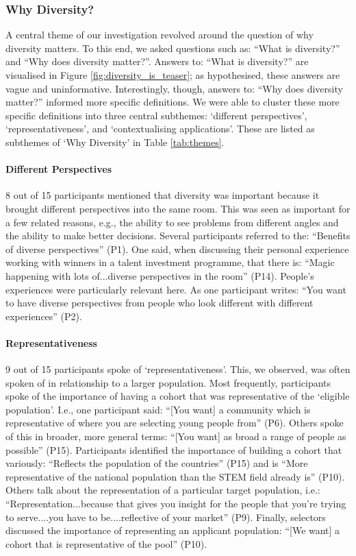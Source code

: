 \subsubsection{Why Diversity?}
A central theme of our investigation revolved around the question of why diversity matters. To this end, we asked questions such as: ``What is diversity?'' and ``Why does diversity matter?''. Answers to: ``What is diversity?'' are visualised in Figure \ref{fig:diversity_is_teaser}; as hypothesised, these answers are vague and uninformative. Interestingly, though, answers to: ``Why does diversity matter?'' informed more specific definitions. We were able to cluster these more specific definitions into three central subthemes: `different perspectives', `representativeness', and `contextualising applications'. These are listed as subthemes of `Why Diversity' in Table \ref{tab:themes}.

\paragraph{Different Perspectives}
8 out of 15 participants mentioned that diversity was important because it brought different perspectives into the same room. This was seen as important for a few related reasons, e.g., the ability to see problems from different angles and the ability to make better decisions. Several participants referred to the: ``Benefits of diverse perspectives'' (P1). One said, when discussing their personal experience working with winners in a talent investment programme, that there is: ``Magic happening with lots of...diverse perspectives in the room'' (P14). People's experiences were particularly relevant here. As one participant writes: ``You want to have diverse perspectives from people who look different with different experiences'' (P2).

\paragraph{Representativeness}
9 out of 15 participants spoke of `representativeness'. This, we observed, was often spoken of in relationship to a larger population. Most frequently, participants spoke of the importance of having a cohort that was representative of the `eligible population'. I.e., one participant said: ``[You want] a community which is representative of where you are selecting young people from'' (P6). Others spoke of this in broader, more general terms: ``[You want] as broad a range of people as possible'' (P15). Participants identified the importance of building a cohort that variously: ``Reflects the population of the countries'' (P15) and is ``More representative of the national population than the STEM field already is'' (P10). Others talk about the representation of a particular target population, i.e.: ``Representation...because that gives you insight for the people that you're trying to serve....you have to be....reflective of your market'' (P9). Finally, selectors discussed the importance of representing an applicant population: ``[We want] a cohort that is representative of the pool'' (P10).

